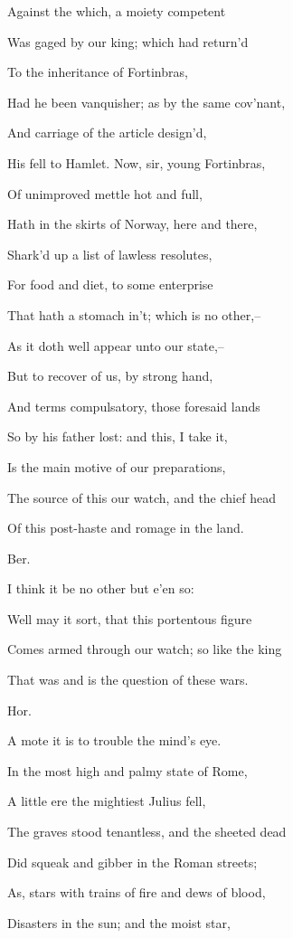 \documentclass[12pt]{book}
\begin{document}
Against the which, a moiety competent

Was gaged by our king; which had return'd

To the inheritance of Fortinbras,

Had he been vanquisher; as by the same cov'nant,

And carriage of the article design'd,

His fell to Hamlet. Now, sir, young Fortinbras,

Of unimproved mettle hot and full,

Hath in the skirts of Norway, here and there,

Shark'd up a list of lawless resolutes,

For food and diet, to some enterprise

That hath a stomach in't; which is no other,--

As it doth well appear unto our state,--

But to recover of us, by strong hand,

And terms compulsatory, those foresaid lands

So by his father lost: and this, I take it,

Is the main motive of our preparations,

The source of this our watch, and the chief head

Of this post-haste and romage in the land.



Ber.

I think it be no other but e'en so:

Well may it sort, that this portentous figure

Comes armed through our watch; so like the king

That was and is the question of these wars.



Hor.

A mote it is to trouble the mind's eye.

In the most high and palmy state of Rome,

A little ere the mightiest Julius fell,

The graves stood tenantless, and the sheeted dead

Did squeak and gibber in the Roman streets;

As, stars with trains of fire and dews of blood,

Disasters in the sun; and the moist star,
\end{document}

